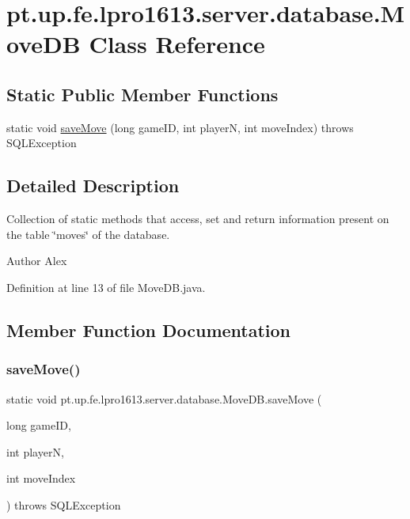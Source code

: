 \hypertarget{classpt_1_1up_1_1fe_1_1lpro1613_1_1server_1_1database_1_1_move_d_b}{}\section{pt.\+up.\+fe.\+lpro1613.\+server.\+database.\+Move\+DB Class Reference}
\label{classpt_1_1up_1_1fe_1_1lpro1613_1_1server_1_1database_1_1_move_d_b}
\subsection*{Static Public Member Functions}
\begin{DoxyCompactItemize}
\item 
static void \hyperlink{classpt_1_1up_1_1fe_1_1lpro1613_1_1server_1_1database_1_1_move_d_b_ab8f0aae8311817ab4ac56a52f50dbe22}{save\+Move} (long game\+ID, int playerN, int move\+Index)  throws S\+Q\+L\+Exception 
\end{DoxyCompactItemize}


\subsection{Detailed Description}
Collection of static methods that access, set and return information present on the table \char`\"{}moves\char`\"{} of the database.

\begin{DoxyAuthor}{Author}
Alex 
\end{DoxyAuthor}


Definition at line 13 of file Move\+D\+B.\+java.



\subsection{Member Function Documentation}
\hypertarget{classpt_1_1up_1_1fe_1_1lpro1613_1_1server_1_1database_1_1_move_d_b_ab8f0aae8311817ab4ac56a52f50dbe22}{}\label{classpt_1_1up_1_1fe_1_1lpro1613_1_1server_1_1database_1_1_move_d_b_ab8f0aae8311817ab4ac56a52f50dbe22} 
\subsubsection{\texorpdfstring{save\+Move()}{saveMove()}}
{\footnotesize\ttfamily static void pt.\+up.\+fe.\+lpro1613.\+server.\+database.\+Move\+D\+B.\+save\+Move (\begin{DoxyParamCaption}\item[{long}]{game\+ID,  }\item[{int}]{playerN,  }\item[{int}]{move\+Index }\end{DoxyParamCaption}) throws S\+Q\+L\+Exception\hspace{0.3cm}{\ttfamily [static]}}


